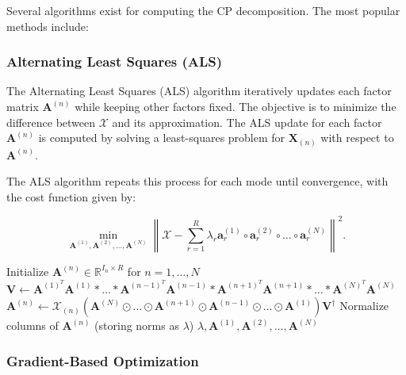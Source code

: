 \documentclass[a4paper,14pt]{article}
\theoremstyle{plain} %
\theoremstyle{definition} %
\theoremstyle{remark} %
\theoremstyle{definition}
\theoremstyle{remark}
\theoremstyle{remark}
\begin{document}
	Several algorithms exist for computing the CP decomposition. The most popular methods include:
	
	\subsubsection{Alternating Least Squares (ALS)}
	
	The Alternating Least Squares (ALS) algorithm iteratively updates each factor matrix \(\mathbf{A}^{(n)}\) while keeping other factors fixed. The objective is to minimize the difference between \(\mathcal{X}\) and its approximation. The ALS update for each factor \(\mathbf{A}^{(n)}\) is computed by solving a least-squares problem for \(\mathbf{X}_{(n)}\) with respect to \(\mathbf{A}^{(n)}\).
	
	The ALS algorithm repeats this process for each mode until convergence, with the cost function given by:
	
	\[
	\min_{\mathbf{A}^{(1)}, \mathbf{A}^{(2)}, \dots, \mathbf{A}^{(N)}} \left\| \mathcal{X} - \sum_{r=1}^R \lambda_r \mathbf{a}^{(1)}_r \circ \mathbf{a}^{(2)}_r \circ \dots \circ \mathbf{a}^{(N)}_r \right\|^2.
	\]
	
	\begin{algorithm}
		\caption{CP-ALS Algorithm}
		\label{alg:CP_ALS}
		\begin{algorithmic}
			\State Initialize $\mathbf{A}^{(n)} \in \mathbb{R}^{I_n \times R}$ for $n = 1, \dots, N$
			\Repeat
			\State $\mathbf{V} \leftarrow \mathbf{A}^{(1)^T} \mathbf{A}^{(1)} \ast \dots \ast \mathbf{A}^{(n-1)^T} \mathbf{A}^{(n-1)} \ast \mathbf{A}^{(n+1)^T} \mathbf{A}^{(n+1)} \ast \dots \ast \mathbf{A}^{(N)^T} \mathbf{A}^{(N)}$
			\State $\mathbf{A}^{(n)} \leftarrow \mathcal{X}_{(n)} (\mathbf{A}^{(N)} \odot \dots \odot \mathbf{A}^{(n+1)} \odot \mathbf{A}^{(n-1)} \odot \dots \odot \mathbf{A}^{(1)}) \mathbf{V}^{\dagger}$
			\State Normalize columns of $\mathbf{A}^{(n)}$ (storing norms as $\lambda$)
			\EndFor
			\State \Return $\lambda, \mathbf{A}^{(1)}, \mathbf{A}^{(2)}, \dots, \mathbf{A}^{(N)}$
			\EndProcedure
		\end{algorithmic}
	\end{algorithm}
	
	\subsubsection{Gradient-Based Optimization}
	
\end{document}

